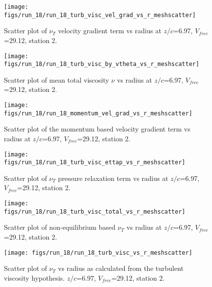 \begin{figure}[H]
\centering
\texttt{[image: figs/run\_18/run\_18\_turb\_visc\_vel\_grad\_vs\_r\_meshscatter]}
\caption{Scatter plot of $\nu_T$ velocity gradient term vs radius at $z/c$=6.97, $V_{free}$=29.12, station 2.}
\end{figure}


\begin{figure}[H]
\centering
\texttt{[image: figs/run\_18/run\_18\_turb\_visc\_by\_vtheta\_vs\_r\_meshscatter]}
\caption{Scatter plot of mean total viscosity $\nu$ vs radius at $z/c$=6.97, $V_{free}$=29.12, station 2.}
\end{figure}


\begin{figure}[H]
\centering
\texttt{[image: figs/run\_18/run\_18\_momentum\_vel\_grad\_vs\_r\_meshscatter]}
\caption{Scatter plot of the momentum based velocity gradient term vs radius at $z/c$=6.97, $V_{free}$=29.12, station 2.}
\end{figure}


\begin{figure}[H]
\centering
\texttt{[image: figs/run\_18/run\_18\_turb\_visc\_ettap\_vs\_r\_meshscatter]}
\caption{Scatter plot of $\nu_T$ pressure relaxation term vs radius at $z/c$=6.97, $V_{free}$=29.12, station 2.}
\end{figure}


\begin{figure}[H]
\centering
\texttt{[image: figs/run\_18/run\_18\_turb\_visc\_total\_vs\_r\_meshscatter]}
\caption{Scatter plot of non-equilibrium based $\nu_T$ vs radius at $z/c$=6.97, $V_{free}$=29.12, station 2.}
\end{figure}


\begin{figure}[H]
\centering
\texttt{[image: figs/run\_18/run\_18\_turb\_visc\_vs\_r\_meshscatter]}
\caption{Scatter plot of $\nu_T$ vs radius as calculated from the turbulent viscosity hypothesis. $z/c$=6.97, $V_{free}$=29.12, station 2.}
\end{figure}


